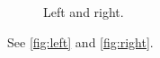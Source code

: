 \documentclass{article}
\begin{document}
\begin{figure}
\centering
\subfigure{
\rule{0.45\textwidth}{1cm}
\label{fig:left}}
\subfigure{
\rule{0.45\textwidth}{1cm}
\label{fig:right}}
\caption{Left and right.}
\end{figure}
See \ref{fig:left} and \ref{fig:right}.
\end{document}
